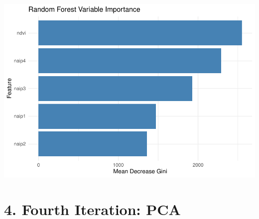 \documentclass[
]{article}
\begin{document}
\includegraphics{veg_model_new_class_files/figure-latex/unnamed-chunk-13-3.pdf}

\section{4. Fourth Iteration: PCA}\label{fourth-iteration-pca}
\end{document}
